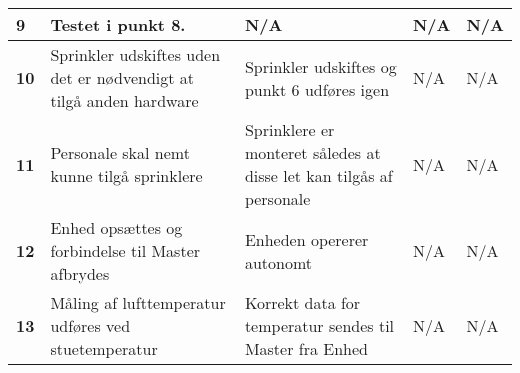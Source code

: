 \begin{center}
\begin{longtable}{|p{}|p{}|p{}|p{}|p{}|}
\textbf{9}	&Testet i punkt 8.
			&N/A
			&N/A
			&N/A \\ \hline 
						
\textbf{10}	&Sprinkler udskiftes uden det er nødvendigt at tilgå anden hardware
			&Sprinkler udskiftes og punkt 6 udføres igen
			&N/A
			&N/A \\ \hline 
			
\textbf{11}	&Personale skal nemt kunne tilgå sprinklere
			&Sprinklere er monteret således at disse let kan tilgås af personale
			&N/A
			&N/A \\ \hline 
			
			
\textbf{12}	&Enhed opsættes og forbindelse til Master afbrydes
			&Enheden opererer autonomt
			&N/A
			&N/A \\ \hline 
			
\textbf{13}	&Måling af lufttemperatur udføres ved stuetemperatur
			&Korrekt data for temperatur sendes til Master fra Enhed
			&N/A
			&N/A \\ \hline 
			
%			
%			
%
\end{longtable}
	\label{ATIFKrav} 
\end{center}


